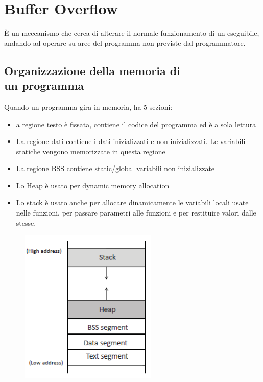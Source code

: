 \chapter{Buffer Overflow}

È un meccanismo che cerca di alterare il normale funzionamento 
di un eseguibile, andando ad operare su aree del programma 
non previste dal programmatore.

\section{Organizzazione della memoria di \\un programma}

Quando un programma gira in memoria, ha 5 sezioni:
\begin{itemize}
    \item a regione testo è fissata, contiene il codice del
    programma ed è a sola lettura
    \item La regione dati contiene i dati inizializzati e non
    inizializzati. Le variabili statiche vengono
    memorizzate in questa regione
    \item La regione BSS contiene static/global variabili non
    inizializzate
    \item Lo Heap è usato per dynamic memory allocation
    \item Lo stack è usato anche per allocare dinamicamente
    le variabili locali usate nelle funzioni, per passare
    parametri alle funzioni e per restituire valori dalle
    stesse.
\end{itemize}

\begin{figure}[ht]
    \centering
    \includegraphics[width=0.55\linewidth]{chapters/images5/prog.png}
\end{figure}

